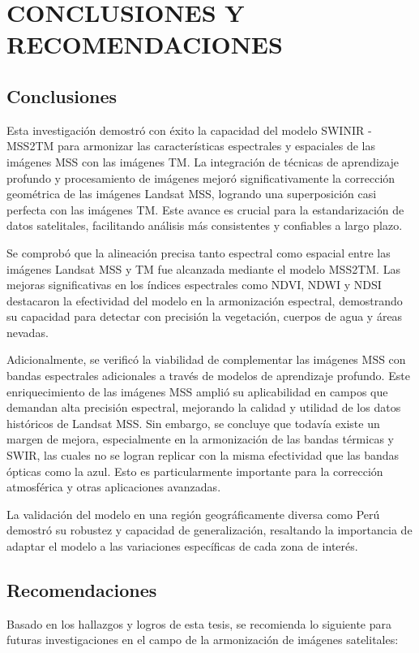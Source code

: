 \chapter{CONCLUSIONES Y RECOMENDACIONES}
    \section{Conclusiones}
        Esta investigación demostró con éxito la capacidad del modelo SWINIR - MSS2TM para armonizar las características espectrales y espaciales de las imágenes MSS con las imágenes TM. La integración de técnicas de aprendizaje profundo y procesamiento de imágenes mejoró significativamente la corrección geométrica de las imágenes Landsat MSS, logrando una superposición casi perfecta con las imágenes TM. Este avance es crucial para la estandarización de datos satelitales, facilitando análisis más consistentes y confiables a largo plazo.

        Se comprobó que la alineación precisa tanto espectral como espacial entre las imágenes Landsat MSS y TM fue alcanzada mediante el modelo MSS2TM. Las mejoras significativas en los índices espectrales como NDVI, NDWI y NDSI destacaron la efectividad del modelo en la armonización espectral, demostrando su capacidad para detectar con precisión la vegetación, cuerpos de agua y áreas nevadas.
        
        Adicionalmente, se verificó la viabilidad de complementar las imágenes MSS con bandas espectrales adicionales a través de modelos de aprendizaje profundo. Este enriquecimiento de las imágenes MSS amplió su aplicabilidad en campos que demandan alta precisión espectral, mejorando la calidad y utilidad de los datos históricos de Landsat MSS. Sin embargo, se concluye que todavía existe un margen de mejora, especialmente en la armonización de las bandas térmicas y SWIR, las cuales no se logran replicar con la misma efectividad que las bandas ópticas como la azul. Esto es particularmente importante para la corrección atmosférica y otras aplicaciones avanzadas.
        
        La validación del modelo en una región geográficamente diversa como Perú demostró su robustez y capacidad de generalización, resaltando la importancia de adaptar el modelo a las variaciones específicas de cada zona de interés.
    
    \section{Recomendaciones}
        Basado en los hallazgos y logros de esta tesis, se recomienda lo siguiente para futuras investigaciones en el campo de la armonización de imágenes satelitales:

